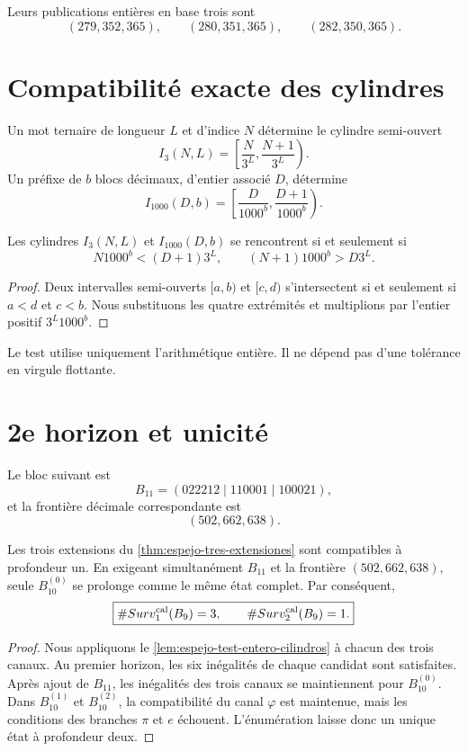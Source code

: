 Leurs publications entières en base trois sont
\[
 (279,352,365),
 \qquad
 (280,351,365),
 \qquad
 (282,350,365).
\]

\section{Compatibilité exacte des cylindres}

Un mot ternaire de longueur \(L\) et d'indice \(N\) détermine le cylindre
semi-ouvert
\[
 I_3(N,L)=\left[\frac{N}{3^L},\frac{N+1}{3^L}\right).
\]
Un préfixe de \(b\) blocs décimaux, d'entier associé \(D\), détermine
\[
 I_{1000}(D,b)=
 \left[\frac{D}{1000^b},\frac{D+1}{1000^b}\right).
\]

\begin{lemma}
\label{lem:espejo-test-entero-cilindros}
Les cylindres \(I_3(N,L)\) et \(I_{1000}(D,b)\) se rencontrent si et seulement si
\[
 N1000^b<(D+1)3^L,
 \qquad
 (N+1)1000^b>D3^L.
\]
\end{lemma}

\begin{proof}
Deux intervalles semi-ouverts \([a,b)\) et \([c,d)\) s'intersectent si et seulement
si \(a<d\) et \(c<b\). Nous substituons les quatre extrémités et multiplions par
l'entier positif \(3^L1000^b\).
\end{proof}

Le test utilise uniquement l'arithmétique entière. Il ne dépend pas d'une tolérance en virgule
flottante.

\section{2e horizon et unicité}

Le bloc suivant est
\[
 B_{11}=(022212\mid110001\mid100021),
\]
et la frontière décimale correspondante est
\[
 (502,662,638).
\]

\begin{theorem}
\label{thm:espejo-seleccion-tres-uno}
Les trois extensions du \cref{thm:espejo-tres-extensiones} sont compatibles
à profondeur un. En exigeant simultanément \(B_{11}\) et la frontière
\((502,662,638)\), seule \(B_{10}^{(0)}\) se prolonge comme le même état
complet. Par conséquent,
\[
 \boxed{
 \#\operatorname{Surv}^{\rm cal}_1(B_9)=3,
 \qquad
 \#\operatorname{Surv}^{\rm cal}_2(B_9)=1.}
\]
\end{theorem}

\begin{proof}
Nous appliquons le \cref{lem:espejo-test-entero-cilindros} à chacun des trois
canaux. Au premier horizon, les six inégalités de chaque candidat sont
satisfaites. Après ajout de \(B_{11}\), les inégalités des trois canaux
se maintiennent pour \(B_{10}^{(0)}\). Dans \(B_{10}^{(1)}\) et
\(B_{10}^{(2)}\), la compatibilité du canal \(\varphi\) est maintenue, mais
les conditions des branches \(\pi\) et \(e\) échouent. L'énumération laisse
donc un unique état à profondeur deux.
\end{proof}

